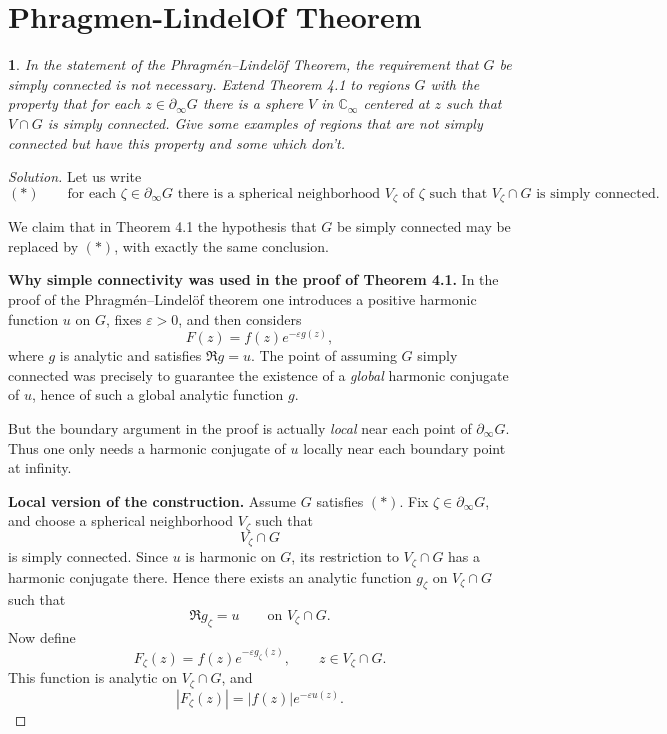 \documentclass[12pt, a4paper]{report}
\theoremstyle{spaced}
\newtheorem{exercise}{}
\newcommand{\setexercise}[1]{\setcounter{exercise}{#1-1}}
\begin{document}
\section{Phragmen-LindelOf Theorem}
\setexercise{1}
\begin{exercise}
	In the statement of the Phragm\'en--Lindel\"of Theorem, the requirement that $G$ be simply connected is not necessary.
	Extend Theorem 4.1 to regions $G$ with the property that for each $z\in \partial_\infty G$ there is a sphere $V$ in $\mathbb{C}_\infty$
	centered at $z$ such that $V\cap G$ is simply connected.
	Give some examples of regions that are not simply connected but have this property and some which don't.
\end{exercise}
\begin{proof}[Solution]
	Let us write
	\[
		(*)\qquad
		\text{for each } \zeta\in \partial_\infty G \text{ there is a spherical neighborhood } V_\zeta
		\text{ of } \zeta
		\text{ such that } V_\zeta\cap G \text{ is simply connected.}
	\]

	We claim that in Theorem 4.1 the hypothesis that \(G\) be simply connected may be replaced by \((*)\), with exactly the same conclusion.

	\medskip
	\textbf{Why simple connectivity was used in the proof of Theorem 4.1.}
	In the proof of the Phragm\'en--Lindel\"of theorem one introduces a positive harmonic function \(u\) on \(G\), fixes \(\varepsilon>0\), and then considers
	\[
		F(z)=f(z)e^{-\varepsilon g(z)},
	\]
	where \(g\) is analytic and satisfies \(\Re g=u\).
	The point of assuming \(G\) simply connected was precisely to guarantee the existence of a \emph{global} harmonic conjugate of \(u\), hence of such a global analytic function \(g\).

	But the boundary argument in the proof is actually \emph{local} near each point of \(\partial_\infty G\). Thus one only needs a harmonic conjugate of \(u\) locally near each boundary point at infinity.

	\medskip
	\textbf{Local version of the construction.}
	Assume \(G\) satisfies \((*)\). Fix \(\zeta\in \partial_\infty G\), and choose a spherical neighborhood \(V_\zeta\) such that
	\[
		V_\zeta\cap G
	\]
	is simply connected. Since \(u\) is harmonic on \(G\), its restriction to \(V_\zeta\cap G\) has a harmonic conjugate there. Hence there exists an analytic function \(g_\zeta\) on \(V_\zeta\cap G\) such that
	\[
		\Re g_\zeta=u \qquad \text{on } V_\zeta\cap G.
	\]
	Now define
	\[
		F_\zeta(z)=f(z)e^{-\varepsilon g_\zeta(z)},\qquad z\in V_\zeta\cap G.
	\]
	This function is analytic on \(V_\zeta\cap G\), and
	\[
		|F_\zeta(z)|=|f(z)|e^{-\varepsilon u(z)}.
	\]


\end{proof}
\end{document}
